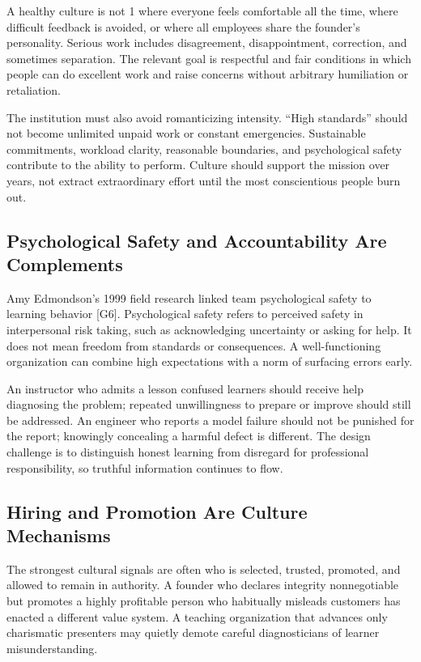 A healthy culture is not 1 where everyone feels comfortable all the time, where difficult feedback is avoided, or where all employees share the founder's personality. Serious work includes disagreement, disappointment, correction, and sometimes separation. The relevant goal is respectful and fair conditions in which people can do excellent work and raise concerns without arbitrary humiliation or retaliation.

The institution must also avoid romanticizing intensity. ``High standards'' should not become unlimited unpaid work or constant emergencies. Sustainable commitments, workload clarity, reasonable boundaries, and psychological safety contribute to the ability to perform. Culture should support the mission over years, not extract extraordinary effort until the most conscientious people burn out.

\subsection{Psychological Safety and Accountability Are Complements}
\label{sec:psychological_safety_accountability}

Amy Edmondson's 1999 field research linked team psychological safety to learning behavior [G6]. Psychological safety refers to perceived safety in interpersonal risk taking, such as acknowledging uncertainty or asking for help. It does not mean freedom from standards or consequences. A well-functioning organization can combine high expectations with a norm of surfacing errors early.

An instructor who admits a lesson confused learners should receive help diagnosing the problem; repeated unwillingness to prepare or improve should still be addressed. An engineer who reports a model failure should not be punished for the report; knowingly concealing a harmful defect is different. The design challenge is to distinguish honest learning from disregard for professional responsibility, so truthful information continues to flow.

\subsection{Hiring and Promotion Are Culture Mechanisms}
\label{sec:hiring_promotion_culture_mechanisms}

The strongest cultural signals are often who is selected, trusted, promoted, and allowed to remain in authority. A founder who declares integrity nonnegotiable but promotes a highly profitable person who habitually misleads customers has enacted a different value system. A teaching organization that advances only charismatic presenters may quietly demote careful diagnosticians of learner misunderstanding.

